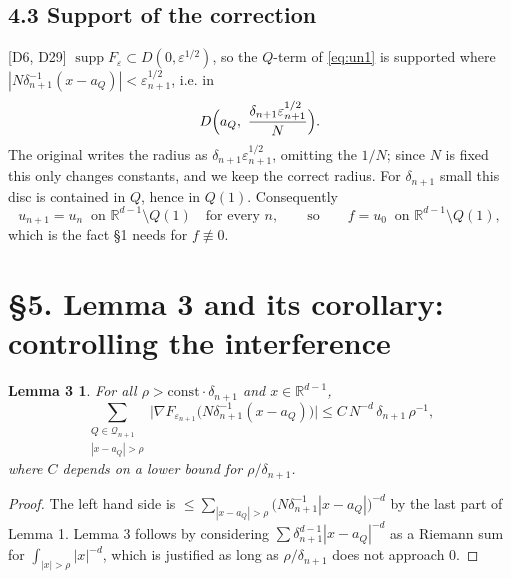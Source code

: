 \documentclass[11pt,reqno]{amsart}
\theoremstyle{plain}
\newtheorem*{lemC}{Lemma 3}
\theoremstyle{definition}
\theoremstyle{plain}
\theoremstyle{definition}
\theoremstyle{remark}
\newcommand{\Rdm}{\mathbb{R}^{d-1}}
\DeclareMathOperator{\supp}{supp}
\newcommand{\Ledger}[1]{{\scriptsize\textsf{[#1]}}}
\begin{document}
\subsection*{4.3 Support of the correction}

\begin{expansion}
\Ledger{D6, D29} $\supp F_\varepsilon\subset D(0,\varepsilon^{1/2})$, so the
$Q$-term of \eqref{eq:un1} is supported where
$|N\delta_{n+1}^{-1}(x-a_Q)|<\varepsilon_{n+1}^{1/2}$, i.e. in
\[D\Bigl(a_Q,\ \frac{\delta_{n+1}\varepsilon_{n+1}^{1/2}}{N}\Bigr).\]
The original writes the radius as $\delta_{n+1}\varepsilon_{n+1}^{1/2}$, omitting
the $1/N$; since $N$ is fixed this only changes constants, and we keep the correct
radius. For $\delta_{n+1}$ small this disc is contained in $Q$, hence in $Q(1)$.
Consequently
\[u_{n+1}=u_n\ \text{ on }\Rdm\setminus Q(1)\quad\text{for every }n,
  \qquad\text{so}\qquad f=u_0\ \text{ on }\Rdm\setminus Q(1),\]
which is the fact \S1 needs for $f\not\equiv0$.
\end{expansion}

\section*{\S5. Lemma 3 and its corollary: controlling the interference}

\begin{lemC}
For all $\rho>\mathrm{const}\cdot\delta_{n+1}$ and $x\in\Rdm$,
\begin{equation}\label{eq:L3}
 \sum_{\substack{Q\in\mathcal Q_{n+1}\\|x-a_Q|>\rho}}
  \bigl|\nabla F_{\varepsilon_{n+1}}\bigl(N\delta_{n+1}^{-1}(x-a_Q)\bigr)\bigr|
 \le C\,N^{-d}\,\delta_{n+1}\,\rho^{-1},
\end{equation}
where $C$ depends on a lower bound for $\rho/\delta_{n+1}$.
\end{lemC}

\begin{proof}
The left hand side is
$\le\sum_{|x-a_Q|>\rho}\bigl(N\delta_{n+1}^{-1}|x-a_Q|\bigr)^{-d}$ by the last part
of Lemma 1. Lemma 3 follows by considering
$\sum\delta_{n+1}^{d-1}|x-a_Q|^{-d}$ as a Riemann sum for
$\int_{|x|>\rho}|x|^{-d}$, which is justified as long as $\rho/\delta_{n+1}$ does
not approach $0$.
\end{proof}
\end{document}
